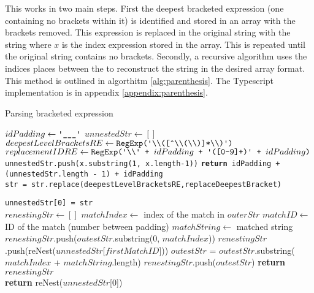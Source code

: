 This works in two main steps. First the deepest bracketed expression (one containing no brackets within it) is identified and stored in an array with the brackets removed. This expression is replaced in the original string with the string  where $x$ is the index expression stored in the array. This is repeated until the original string contains no brackets. Secondly, a recursive algorithm uses the indices places between the \texttt{\upquote{\_\_\_}} to reconstruct the string in the desired array format. This method is outlined in algorthitm \ref{alg:parenthesis}. The Typescript implementation is in appendix \ref{appendix:parenthesis}.

\begin{algorithm}[!htbp]
\caption{Parsing bracketed expression}
\label{alg:parenthesis}
\begin{algorithmic}[1]

   \State $idPadding\gets \texttt{\upquote{\_\_\_}}$
   \State $unnestedStr\gets []$
   \State $deepestLevelBracketsRE\gets \texttt{RegExp(\upquote{\textbackslash\textbackslash([\^{}\textbackslash\textbackslash(\textbackslash\textbackslash)]*\textbackslash\textbackslash)})}$
   \State $replacementIDRE\gets \texttt{RegExp(\upquote{\textbackslash\textbackslash} + }idPadding\texttt{ + \upquote{([0-9]+)} + }idPadding\texttt{)}$\\

     \State \texttt{unnestedStr.push(x.substring(1, x.length-1))}
     \State \texttt{\textbf{return} idPadding + (unnestedStr.length - 1) + idPadding}
   \EndProcedure \\

     \State \texttt{str = str.replace(deepestLevelBracketsRE,replaceDeepestBracket)}
   \EndWhile

   \State \texttt{unnestedStr[0] = str}\\

     \State $renestingStr\gets []$
       \State $matchIndex\gets$ index of the match in $outerStr$
       \State $matchID\gets$ ID of the match (number between padding)
       \State $matchString\gets$ matched string\\

				\State $renestingStr$.push($outestStr$.substring(0, $matchIndex$))
			\EndIf
			\State $renestingStr$.push(reNest($unnestedStr$[$firstMatchID$]))
			\State $outestStr$ = $outestStr$.substring($matchIndex$ + $matchString$.length)
     \EndWhile
     \State $renestingStr$.push($outestStr$)
     \State \textbf{return} $renestingStr$
   \EndProcedure \\

   \State \textbf{return} reNest($unnestedStr$[0])

\EndProcedure
\end{algorithmic}
\end{algorithm}


